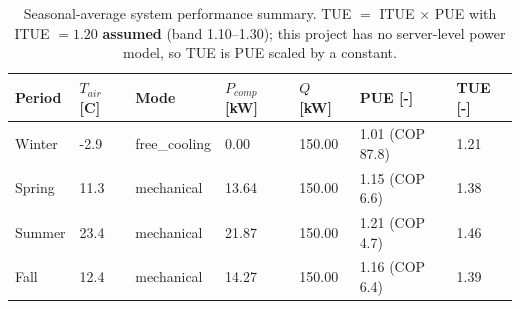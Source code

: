 \begin{table}[h!]
\caption{Seasonal-average system performance summary. TUE $=$ ITUE $\times$ PUE with ITUE $= 1.20$ \textbf{assumed} (band 1.10--1.30); this project has no server-level power model, so TUE is PUE scaled by a constant.}
\label{tab:seasonal_summary}
\begin{tabularx}{\linewidth}{lLLLLLL}
\toprule
\textbf{Period} & \textbf{$T_{air}$ [C]} & \textbf{Mode} & \textbf{$P_{comp}$ [kW]} & \textbf{$Q$ [kW]} & \textbf{PUE [-]} & \textbf{TUE [-]} \\
\midrule
Winter & -2.9 & free\_cooling & 0.00 & 150.00 & 1.01 (COP 87.8) & 1.21 \\
Spring & 11.3 & mechanical & 13.64 & 150.00 & 1.15 (COP 6.6) & 1.38 \\
Summer & 23.4 & mechanical & 21.87 & 150.00 & 1.21 (COP 4.7) & 1.46 \\
Fall & 12.4 & mechanical & 14.27 & 150.00 & 1.16 (COP 6.4) & 1.39 \\
\bottomrule
\end{tabularx}
\end{table}
